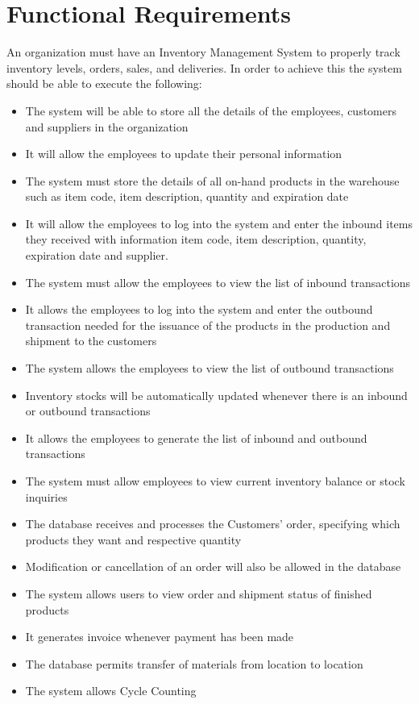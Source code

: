 \section{Functional Requirements}

An organization must have an Inventory Management System to properly track inventory levels, orders, sales, and deliveries. In order to achieve this the system should be able to execute the following:

\begin{itemize}
    \item The system will be able to store all the details of the employees, customers and suppliers in the organization
    \item It will allow the employees to update their personal information
    \item The system must store the details of all on-hand products in the warehouse such as item code, item description, quantity and expiration date
    \item It will allow the employees to log into the system and enter the inbound items they received with information item code, item description, quantity, expiration date and supplier. 
    \item The system must allow the employees to view the list of inbound transactions
    \item It allows the employees to log into the system and enter the outbound transaction needed for the issuance of the products in the production and shipment to the customers
    \item The system allows the employees to view the list of outbound transactions
    \item Inventory stocks will be automatically updated whenever there is an inbound or outbound transactions
    \item It allows the employees to generate the list of inbound and outbound transactions 
    \item The system must allow employees to view current inventory balance or stock inquiries
    \item The database receives and processes the Customers’ order, specifying which products they want and respective quantity
    \item Modification or cancellation of an order will also be allowed in the database
    \item The system allows users to view order and shipment status of finished products
    \item It generates invoice whenever payment has been made
    \item The database permits transfer of materials from location to location
    \item The system allows Cycle Counting
\end{itemize}